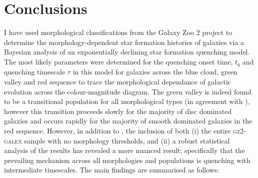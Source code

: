 \section{Conclusions}\label{morph:conc}

I have used morphological classifications from the Galaxy Zoo 2 project to determine the morphology-dependent star formation histories of galaxies via a Bayesian analysis of an exponentially declining star formation quenching model. The most likely parameters were determined for the quenching onset time, $t_q$ and quenching timescale $\tau$ in this model for galaxies across the blue cloud, green valley and red sequence to trace the morphological dependance of galactic evolution across the colour-magnitude diagram. The green valley is indeed found to be a transitional population for all morphological types (in agreement with \citet{schawinski14}), however this transition proceeds slowly for the majority of disc dominated galaxies and occurs rapidly for the majority of smooth dominated galaxies in the red sequence. However, in addition to \citealt{schawinski14}, the inclusion of both (i) the entire \textsc{gz2-galex} sample with no morphology thresholds, and (ii) a robust statistical analysis of the results has revealed a more nuanced result; specifically that the prevailing mechanism across all morphologies and populations is quenching with intermediate timescales. The main findings are summarised as follows:
